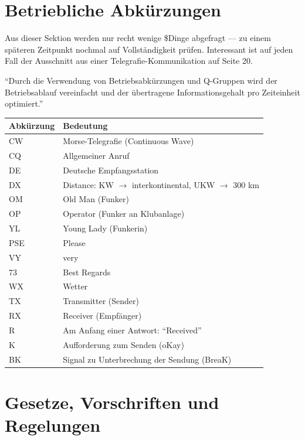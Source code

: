 \documentclass[11pt,BCOR=8.5mm]{scrartcl}
\begin{document}
\section{Betriebliche Abkürzungen}
Aus dieser Sektion werden nur recht wenige \$Dinge abgefragt --- zu
einem späteren Zeitpunkt nochmal auf Vollständigkeit prüfen. Interessant
ist auf jeden Fall der Ausschnitt aus einer Telegrafie-Kommunikation auf
Seite 20.

"`Durch die Verwendung von Betriebsabkürzungen und Q-Gruppen wird der
Betriebsablauf vereinfacht und der übertragene Informationsgehalt pro
Zeiteinheit optimiert."'

\begin{table}[h]
  \centering
  \begin{tabular}{| l | l | }
  \hline
  Abkürzung & Bedeutung \\
  \hline
  \hline
  CW & Morse-Telegrafie (Continuous Wave) \\
  \hline
  CQ & Allgemeiner Anruf \\
  \hline
  DE & Deutsche Empfangsstation \\
  \hline
  DX & Distance: KW $\rightarrow$ interkontinental, UKW $\rightarrow$ 
	  300 km \\
  \hline
  OM & Old Man (Funker) \\
  \hline
  OP & Operator (Funker an Klubanlage) \\
  \hline
  YL & Young Lady (Funkerin) \\
  \hline
  PSE & Please \\
  \hline
  VY & very \\
  \hline
  73 & Best Regards \\
  \hline
  WX & Wetter \\
  \hline
  TX & Transmitter (Sender) \\
  \hline
  RX & Receiver (Empfänger) \\
  \hline
  R & Am Anfang einer Antwort: "`Received"' \\
  \hline
  K & Aufforderung zum Senden (oKay) \\
  \hline
  BK & Signal zu Unterbrechung der Sendung (BreaK) \\
  \hline
\end{tabular}
\end{table}
 

\section{Gesetze, Vorschriften und Regelungen}
\end{document}
